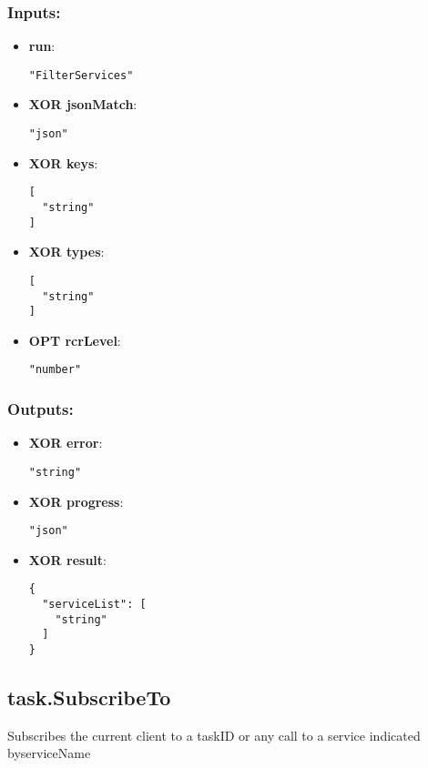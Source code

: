 \subsubsection*{Inputs:}
\begin{itemize}
    \item \textbf{run}: 
\begin{lstlisting}
"FilterServices"
\end{lstlisting}
    \item \textbf{XOR jsonMatch}: 
\begin{lstlisting}
"json"
\end{lstlisting}
    \item \textbf{XOR keys}: 
\begin{lstlisting}
[
  "string"
]
\end{lstlisting}
    \item \textbf{XOR types}: 
\begin{lstlisting}
[
  "string"
]
\end{lstlisting}
    \item \textbf{OPT rcrLevel}: 
\begin{lstlisting}
"number"
\end{lstlisting}
  \end{itemize}

\subsubsection*{Outputs:}
\begin{itemize}
    \item \textbf{XOR error}: 
\begin{lstlisting}
"string"
\end{lstlisting}
    \item \textbf{XOR progress}: 
\begin{lstlisting}
"json"
\end{lstlisting}
    \item \textbf{XOR result}: 
\begin{lstlisting}
{
  "serviceList": [
    "string"
  ]
}
\end{lstlisting}
  \end{itemize}

\subsection{task.SubscribeTo}
Subscribes the current client to a taskID or any call to a service indicated byserviceName
